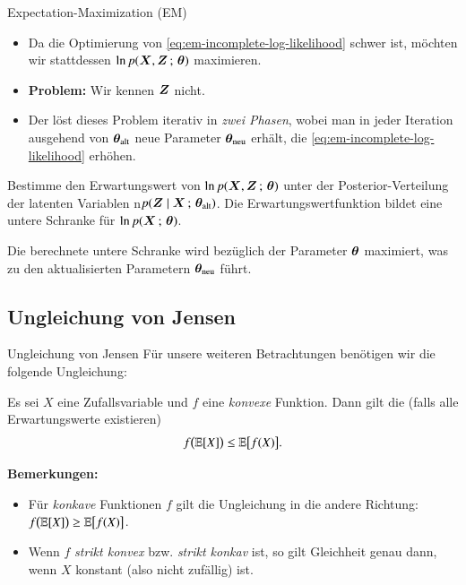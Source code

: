\begin{frame}{Expectation-Maximization (EM)}{}
	\begin{itemize}
		\item Da die Optimierung von \eqref{eq:em-incomplete-log-likelihood} schwer ist, möchten wir stattdessen
			$\ln p(\bm{X}, \bm{Z} \,;\, \bm{\theta})$ maximieren.
		\item \textbf{Problem:} Wir kennen $\bm{Z}$ nicht.
		\item Der  löst dieses Problem iterativ in \textit{zwei Phasen},
			wobei man in jeder Iteration ausgehend von $\bm{\theta}_{\text{alt}}$ neue Parameter $\bm{\theta}_{\text{neu}}$ erhält,
			die \eqref{eq:em-incomplete-log-likelihood} erhöhen.
	\end{itemize}

	\begin{boxGray}
		 Bestimme den Erwartungswert von $\ln p(\bm{X}, \bm{Z} \,;\, \bm{\theta})$ unter der Posterior-Verteilung
		der latenten Variablen n$p(\bm{Z} \mid \bm{X} \,;\, \bm{\theta}_{\text{alt}})$. Die Erwartungswertfunktion bildet eine
		untere Schranke für $\ln p(\bm{X} \,;\, \bm{\theta})$.
	\end{boxGray}

	\begin{boxGray}
		 Die berechnete untere Schranke wird bezüglich der Parameter $\bm{\theta}$ maximiert,
		was zu den aktualisierten Parametern $\bm{\theta}_{\text{neu}}$ führt.
	\end{boxGray}
\end{frame}


\subsection{Ungleichung von Jensen}

\begin{frame}{Ungleichung von Jensen}{}
	Für unsere weiteren Betrachtungen benötigen wir die folgende Ungleichung:
	\begin{mytheo}[th:em-jensen]
		Es sei $X$ eine Zufallsvariable und $f$ eine \textit{konvexe} Funktion. Dann gilt die \keyword{Ungleichung von Jensen}
		(falls alle Erwartungswerte existieren)
		\begin{equation*}
			f\bigl( \mathbb{E}[X] \bigr) \le \mathbb{E}\bigl[ f(X) \bigr].
		\end{equation*}
	\end{mytheo}
	
	\begin{boxGray}
		\textbf{Bemerkungen:}
		\begin{itemize}
			\item Für \textit{konkave} Funktionen $f$ gilt die Ungleichung in die andere Richtung: $f\bigl( \mathbb{E}[X] \bigr) \ge \mathbb{E}\bigl[ f(X) \bigr]$.
			\item Wenn $f$  \textit{strikt konvex} bzw. \textit{strikt konkav} ist, so gilt Gleichheit genau dann,
				wenn $X$ konstant (also nicht zufällig) ist.
		\end{itemize}
	\end{boxGray}
\end{frame}


